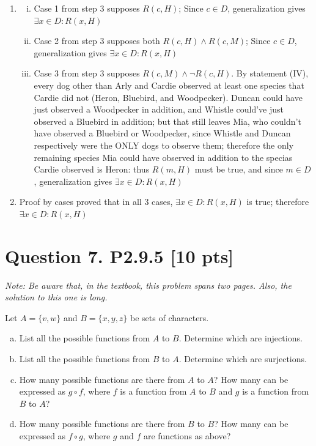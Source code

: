 \documentclass[12pt]{article}
\begin{document}
\begin{enumerate}[(a)]
\begin{enumerate}[1.]
				\item
					\begin{enumerate}[(i)]
						\item Case 1 from step 3 supposes $R(c,H)$; Since $c \in D$, generalization
							gives $\exists x \in D: R(x,H)$

						\item Case 2 from step 3 supposes both $R(c,H) \land R(c,M)$; Since
							$c \in D$, generalization gives $\exists x \in D: R(x,H)$

						\item Case 3 from step 3 supposes $R(c,M) \land \lnot R(c,H)$. By
							statement (IV), every dog other than Arly and Cardie observed at least
							one species that Cardie did not (Heron, Bluebird, and Woodpecker).
							Duncan could have just observed a Woodpecker in addition, and Whistle
							could've just observed a Bluebird in addition; but that still
							leaves Mia, who couldn't have observed a Bluebird or Woodpecker,
							since Whistle and Duncan respectively were the ONLY dogs to
							observe them; therefore the only remaining species Mia could have observed
							in addition to the specias Cardie observed is Heron: thus $R(m,H)$
							must be true, and since $m \in D$, generalization gives
							$\exists x \in D: R(x,H)$
					\end{enumerate}

				\item Proof by cases proved that in all 3 cases,
					$\exists x \in D: R(x,H)$ is true; therefore $\exists x \in D: R(x,H)$
			\end{enumerate}
	\end{enumerate}
	\newpage

	\newpage

	\section*{\textbf{Question 7. P2.9.5} [10 pts]}
	{\em \small Note: Be aware that, in the textbook, this problem spans two pages. Also, the solution to this one is long.}

	Let $A = \{v, w\}$ and $B = \{x, y, z\}$ be sets of characters.

	\begin{enumerate}[(a)]
		\item List all the possible functions from $A$ to $B$. Determine which are
			injections.

		\item List all the possible functions from $B$ to $A$. Determine which are
			surjections.

		\item How many possible functions are there from $A$ to $A$? How many can be
			expressed as $g \circ f$, where $f$ is a function from $A$ to $B$ and $g$ is
			a function from $B$ to $A$?

		\item How many possible functions are there from $B$ to $B$? How many can be
			expressed as $f \circ g$, where $g$ and $f$ are functions as above?
	\end{enumerate}
\end{document}
